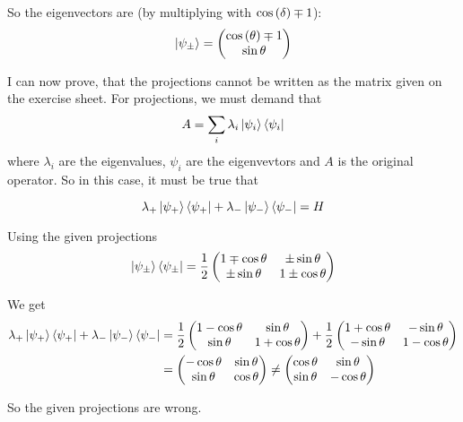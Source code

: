 \documentclass[a4paper,german,12pt,smallheadings]{scrartcl}
\begin{document}
\begin{enumerate}[a)]
    So the eigenvectors are (by multiplying with $\cos\del\delta \mp 1$):
    \begin{equation*}
    \ket{\psi_\pm} = \begin{pmatrix} \cos\del\theta \mp 1 \\ \sin\theta \end{pmatrix}
    \end{equation*}

    I can now prove, that the projections cannot be written as the matrix given
    on the exercise sheet. For projections, we must demand that
    \begin{align*}
      A = \sum_i \lambda_i \ket{\psi_i}\bra{\psi_i}
    \end{align*}
    where $\lambda_i$ are the eigenvalues, $\psi_i$ are the eigenvevtors and
    $A$ is the original operator. So in this case, it must be true that

    \begin{equation*}
      \lambda_+ \ket{\psi_+} \bra{\psi_+} + \lambda_- \ket{\psi_-} \bra{\psi_-} = H
    \end{equation*}

    Using the given projections
    \begin{equation*}
      \ket{\psi_\pm} \bra{\psi_\pm} = \frac{1}{2} \begin{pmatrix}
        1 \mp \cos \theta & \pm \sin \theta \\
        \pm \sin \theta & 1 \pm \cos \theta
      \end{pmatrix}
    \end{equation*}

    We get
    \begin{align*}
      \lambda_+ \ket{\psi_+} \bra{\psi_+} + \lambda_- \ket{\psi_-} \bra{\psi_-} &=
      \frac{1}{2} \begin{pmatrix}
        1 - \cos \theta &  \sin \theta \\
         \sin \theta & 1 + \cos \theta
      \end{pmatrix}
      +
      \frac{1}{2} \begin{pmatrix}
        1 + \cos \theta &  -\sin \theta \\
         -\sin \theta & 1 - \cos \theta
      \end{pmatrix}\\
      &=
      \begin{pmatrix}
        -\cos \theta &  \sin \theta \\
         \sin \theta &  \cos \theta
      \end{pmatrix}
      \neq
      \begin{pmatrix}
        \cos \theta &  \sin \theta \\
         \sin \theta &  -\cos \theta
      \end{pmatrix}
    \end{align*}

    So the given projections are wrong.


\end{enumerate}
\end{document}
